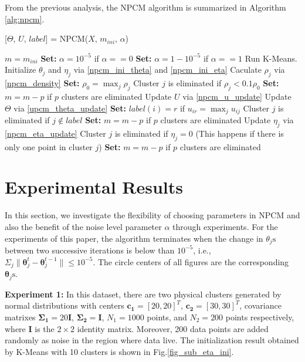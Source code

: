 \documentclass[conference]{IEEEtran}
\theoremstyle{definition}
\begin{document}
From the previous analysis, the NPCM algorithm is summarized in Algorithm \ref{alg:npcm}.
\begin{algorithm}
\caption{ [$\Theta$, $U$, $label$] = NPCM($X$, $m_{ini}$, $\alpha$)}
\label{alg:npcm}
\begin{algorithmic}[1]
\State $m=m_{ini}$
\State \textbf{Set:} $\alpha=10^{-5}$ if $\alpha==0$
\State \textbf{Set:} $\alpha=1-10^{-5}$ if $\alpha==1$
\State Run K-Means.
\State Initialize $\theta_j$ and $\eta_j$ via \eqref{npcm_ini_theta} and \eqref{npcm_ini_eta}
\State Caculate $\rho_j$ via \eqref{npcm_density}
\State \textbf{Set:} $\rho_0=\max_j\rho_j$
\State Cluster $j$ is eliminated if $\rho_j<0.1\rho_0$
\State \textbf{Set:} $m=m-p$ if $p$ clusters are eliminated
\Repeat
\State Update $U$ via \eqref{npcm_u_update}
\State Update $\Theta$ via \eqref{upcm_theta_update}
\State \textbf{Set:} $label(i)=r$ if $u_{ir}=\max_j u_{ij}$
\EndFor
\State Cluster $j$ is eliminated if $j \notin label$
\State \textbf{Set:} $m=m-p$ if  $p$ clusters are eliminated
\State Update $\eta_j$ via \eqref{npcm_eta_update}
\State Cluster $j$ is eliminated if $\eta_j=0$ (This happens if there is only one point in cluster $j$)
\State \textbf{Set:} $m=m-p$ if  $p$ clusters are eliminated
\\
\end{algorithmic}
\end{algorithm}
\section{Experimental Results}
\label{sec-4}
In this section, we investigate the flexibility of choosing parameters in NPCM and also the benefit of the noise level parameter $\alpha$ through experiments. For the experiments of this paper, the algorithm terminates when the change in $\theta_j\text{s}$ between two successive iterations is below than $10^{-5}$, i.e., $\Sigma_j\|\boldsymbol{\theta}_j^{t}-\boldsymbol{\theta}_j^{t-1}\|\leq10^{-5}$. The circle centers of all figures are the corresponding $\boldsymbol{\theta}_j\text{s}$.

\textbf{Experiment 1:} In this dataset, there are two physical clusters generated by normal distributions with centers $\mathbf{c_1}=[20, 20]^T$, $\mathbf{c_2}=[30, 30]^T$, covariance matrixes $\mathbf{\Sigma_1}=20\mathbf{I}$, $\mathbf{\Sigma_2}=\mathbf{I}$, $N_1=1000$ points, and $N_2=200$ points  respectively, where $\mathbf{I}$ is the $2\times 2$ identity matrix. Moreover, 200 data points are added randomly as noise in the region where data live. 
The initialization result obtained by K-Means with 10 clusters is shown in Fig.\ref{fig_sub_eta_ini}.
\end{document}
